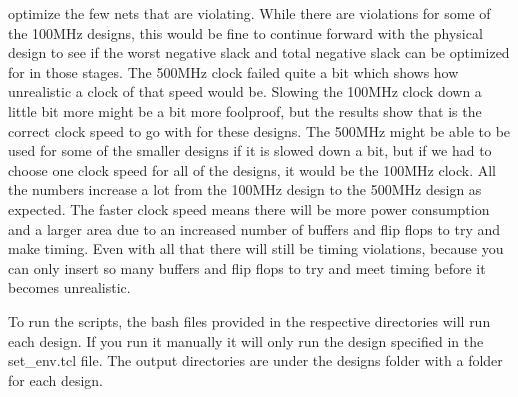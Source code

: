 \documentclass[journal, onecolumn]{IEEEtran}
\begin{document}
optimize the few nets that are violating. While there are violations for some of the 100MHz designs, this would be fine to continue forward
with the physical design to see if the worst negative slack and total negative slack can be optimized for in those stages. The 500MHz clock
failed quite a bit which shows how unrealistic a clock of that speed would be. Slowing the 100MHz clock down a little bit more might be a bit more
foolproof, but the results show that is the correct clock speed to go with for these designs. The 500MHz might be able to be used for some of the smaller
designs if it is slowed down a bit, but if we had to choose one clock speed for all of the designs, it would be the 100MHz clock. All the numbers increase a lot
from the 100MHz design to the 500MHz design as expected. The faster clock speed means there will be more power consumption and a larger area due to an increased
number of buffers and flip flops to try and make timing. Even with all that there will still be timing violations, because you can only insert so many
buffers and flip flops to try and meet timing before it becomes unrealistic.

To run the scripts, the bash files provided in the respective directories will run each design. If you run it manually it will only run the design specified
in the set\_env.tcl file. The output directories are under the designs folder with a folder for each design.
\end{document}
